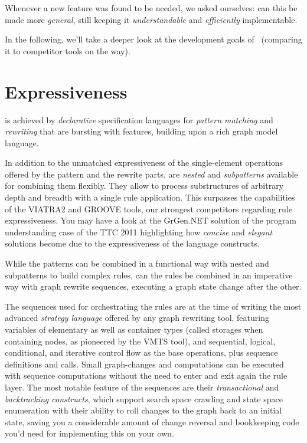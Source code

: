 Whenever a new feature was found to be needed, we asked ourselves: can this be made more \emph{general}, still keeping it \emph{understandable} and \emph{efficiently} implementable.
 
In the following, we'll take a deeper look at the development goals of \GrG\ (comparing it to competitor tools on the way).

\section{Expressiveness}
is achieved by \emph{declarative} specification languages for \emph{pattern matching} and \emph{rewriting} that are bursting with features, building upon a rich graph model language.

In addition to the unmatched expressiveness of the single-element operations offered by the pattern and the rewrite parts,
are \emph{nested} and \emph{subpatterns} available for combining them flexibly.
They allow to process substructures of arbitrary depth and breadth with a single rule application.
This surpasses the capabilities of the VIATRA2\cite{viatra2,recursiveviatra} and GROOVE \cite{Groove} tools, our strongest competitors regarding rule expressiveness.
You may have a look at the GrGen.NET solution of the program understanding case \cite{ProgramUnderstanding} of the TTC 2011 highlighting how \emph{concise} and \emph{elegant} solutions become due to the expressiveness of the language constructs.

While the patterns can be combined in a functional way with nested and subpatterns to build complex rules, can the rules be combined in an imperative way with graph rewrite sequences, executing a graph state change after the other.

The sequences used for orchestrating the rules are at the time of writing the most advanced \emph{strategy language} offered by any graph rewriting tool, featuring variables of elementary as well as container types (called storages when containing nodes, as pioneered by the VMTS\cite{vmts} tool), and sequential, logical, conditional, and iterative control flow as the base operations, plus sequence definitions and calls.
Small graph-changes and computations can be executed with sequence computations without the need to enter and exit again the rule layer.
The most notable feature of the sequences are their \emph{transactional} and \emph{backtracking constructs}, which support search space crawling and state space enumeration with their ability to roll changes to the graph back to an initial state, saving you a considerable amount of change reversal and bookkeeping code you'd need for implementing this on your own.

